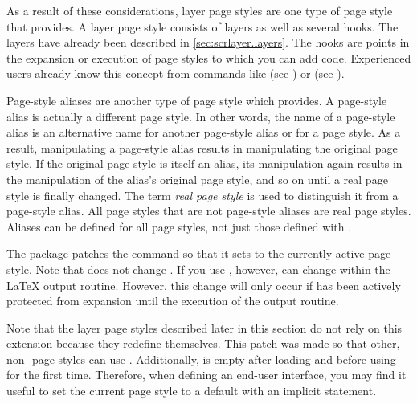As a result of these considerations, layer page
styles%
 are one type of page style that 
 provides. A layer page style consists of layers as well as
several hooks. The layers have already been described in
\autoref{sec:scrlayer.layers}. The hooks%
 are points in the expansion or execution of page styles to
which you can add code. Experienced users already know this concept from
commands like  (see \cite{latex:usrguide}) or
 (see
).

Page-style aliases are another type of page style which 
provides. A page-style alias is actually a different page style. In other
words, the name of a page-style alias is an alternative name for another
page-style alias or for a page style. As a result, manipulating a page-style
alias results in manipulating the original page style. If the original page
style is itself an alias, its manipulation again results in the manipulation
of the alias's original page style, and so on until a real page style is
finally changed. The term \emph{real page style} is
used to distinguish it from a page-style alias. All page styles that are not
page-style aliases are real page styles. Aliases can be defined for all page
styles, not just those defined with .

\begin{Declaration}
\end{Declaration}
The  package patches the 
command so that it sets  to the currently active page
style. Note that  does not change
. If you use ,
however,  can change within the \LaTeX{} output
routine. However, this change will only occur if  has
been actively protected from expansion until the execution of the output
routine.

Note that the layer page styles described later in this section do not rely on
this  extension because they redefine
 themselves. This patch was made so that other,
non- page styles can use .
Additionally,  is empty after loading
 and before using  for the
first time. Therefore, when defining an end-user interface, you may find it
useful to set the current page style to a default with an implicit
 statement.

